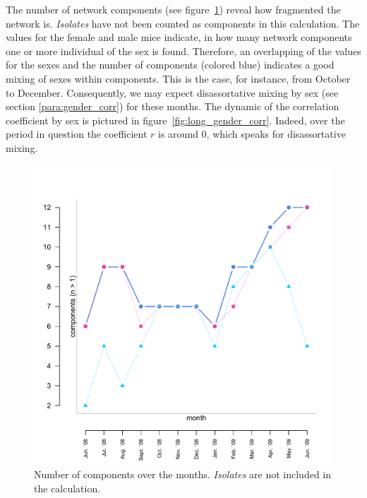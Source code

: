 The number of network components (see figure~\ref{fig:long_comps}) reveal how fragmented the network is. \textit{Isolates} have not been counted as components in this calculation. The values for the female and male mice indicate, in how many network components one or more individual of the sex is found. Therefore, an overlapping of the values for the sexes and the number of components (colored blue) indicates a good mixing of sexes within components. This is the case, for instance, from October to December. Consequently, we may expect disassortative mixing by sex (see section \ref{para:gender_corr}) for these months. The dynamic of the correlation coefficient by sex is pictured in figure~\ref{fig:long_gender_corr}. Indeed, over the period in question the coefficient $r$ is around 0, which speaks for disassortative mixing.

\begin{figure}[htpb]
\begin{center}
  \includegraphics[width=.6\textwidth]{assets/pdf/long_comps.pdf}
  \caption[Number of components over the months]{Number of components over the months. \textit{Isolates} are not included in the calculation.}
  \label{fig:long_comps}
\end{center}
\end{figure}


% 

